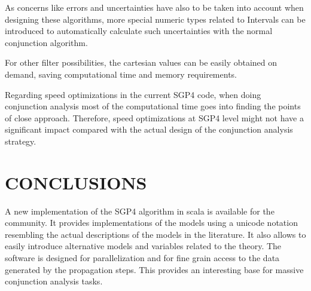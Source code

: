 \documentclass{article}
\begin{document}
As concerns like errors and uncertainties have also to be taken into account when designing these
algorithms, more special numeric types related to Intervals can be introduced to automatically
calculate such uncertainties with the normal conjunction algorithm.

For other filter possibilities, the cartesian values can be easily obtained on demand, saving computational time and memory requirements.

Regarding speed optimizations in the current SGP4 code, when doing conjunction analysis most of the computational time goes into finding the points of close approach. Therefore, speed optimizations at SGP4 level might not have a significant impact compared with the actual design of the conjunction analysis strategy.


\section{CONCLUSIONS}
\label{sec:conclusions}

A new implementation of the SGP4 algorithm in scala is available for the community.
It provides implementations of the models using a unicode notation resembling the
actual descriptions of the models in the literature. It also allows to easily
introduce alternative models and variables related to the theory.
The software is designed for parallelization and for fine grain access to the data generated by
the propagation steps. This provides an
interesting base for massive conjunction analysis tasks.



\end{document}
